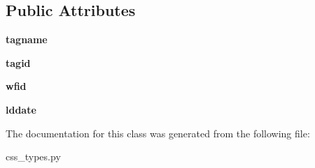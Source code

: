 \subsection*{Public Attributes}
\begin{DoxyCompactItemize}
\item 
\hypertarget{classcss__types_1_1wftag30_a4b3ae00ca053bdb69d99f175459f6f13}{}{\bfseries tagname}\label{classcss__types_1_1wftag30_a4b3ae00ca053bdb69d99f175459f6f13}

\item 
\hypertarget{classcss__types_1_1wftag30_aab72b8e82967103358e5ea75e50e4126}{}{\bfseries tagid}\label{classcss__types_1_1wftag30_aab72b8e82967103358e5ea75e50e4126}

\item 
\hypertarget{classcss__types_1_1wftag30_a5fba45684bcac4f3043f271e83fd8b2d}{}{\bfseries wfid}\label{classcss__types_1_1wftag30_a5fba45684bcac4f3043f271e83fd8b2d}

\item 
\hypertarget{classcss__types_1_1wftag30_a5c960132592b9b52d76f423912654b10}{}{\bfseries lddate}\label{classcss__types_1_1wftag30_a5c960132592b9b52d76f423912654b10}

\end{DoxyCompactItemize}


The documentation for this class was generated from the following file\+:\begin{DoxyCompactItemize}
\item 
css\+\_\+types.\+py\end{DoxyCompactItemize}
